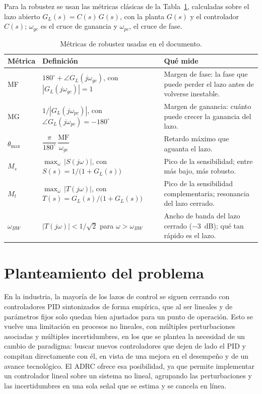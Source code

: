 Para la robustez se usan las métricas clásicas de la Tabla~\ref{tab:metricas_robustez}, calculadas
sobre el lazo abierto $G_L(s) = C(s)\,G(s)$, con la planta $G(s)$ y el controlador $C(s)$;
$\omega_{gc}$ es el cruce de ganancia y $\omega_{pc}$, el cruce de fase.

\begin{table}[H]
\centering
\caption{Métricas de robustez usadas en el documento.}
\label{tab:metricas_robustez}
\small
\renewcommand{\arraystretch}{1.3}
\begin{tabular}{@{}l>{\centering\arraybackslash}p{6.0cm}>{\raggedright\arraybackslash}p{7.0cm}@{}}
\toprule
\textbf{Métrica} & \textbf{Definición} & \textbf{Qué mide} \\
\midrule
MF & $180^{\circ} + \angle G_L(j\omega_{gc})$, \newline con $|G_L(j\omega_{gc})| = 1$ & Margen de fase: la fase que puede perder el lazo antes de volverse inestable. \\
MG & $1/|G_L(j\omega_{pc})|$, \newline con $\angle G_L(j\omega_{pc}) = -180^{\circ}$ & Margen de ganancia: cuánto puede crecer la ganancia del lazo. \\
$\theta_{\max}$ & $\dfrac{\pi}{180^{\circ}}\,\dfrac{\mathrm{MF}}{\omega_{gc}}$ & Retardo máximo que aguanta el lazo. \\
$M_s$ & $\max_{\omega}\,|S(j\omega)|$, \newline con $S(s) = 1/\bigl(1 + G_L(s)\bigr)$ & Pico de la sensibilidad; entre más bajo, más robusto. \\
$M_t$ & $\max_{\omega}\,|T(j\omega)|$, \newline con $T(s) = G_L(s)/\bigl(1 + G_L(s)\bigr)$ & Pico de la sensibilidad complementaria; resonancia del lazo cerrado. \\
$\omega_{BW}$ & $|T(j\omega)| < 1/\sqrt{2}$ para $\omega > \omega_{BW}$ & Ancho de banda del lazo cerrado ($-3$~dB); qué tan rápido es el lazo. \\
\bottomrule
\end{tabular}
\end{table}

\section{Planteamiento del problema}
\label{sec:problema}

En la industria, la mayoría de los lazos de control se siguen cerrando con
controladores PID sintonizados de forma empírica, que al ser lineales y de
parámetros fijos solo quedan bien ajustados para un punto de operación. Esto
se vuelve una limitación en procesos no lineales, con múltiples perturbaciones
asociadas y múltiples incertidumbres, en los que se plantea la necesidad de un
cambio de paradigma: buscar nuevos controladores que dejen de lado el PID y
compitan directamente con él, en vista de una mejora en el desempeño y de un
avance tecnológico. El ADRC ofrece esa posibilidad, ya que permite implementar
un controlador lineal sobre un sistema no lineal, agrupando las perturbaciones
y las incertidumbres en una sola señal que se estima y se cancela en línea.

